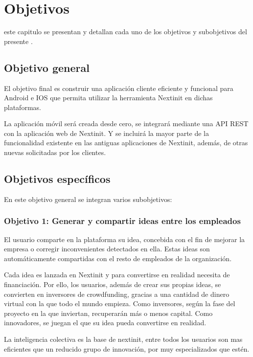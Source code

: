 \chapter{Objetivos}
\label{chap:objetivos}

 este capitulo se presentan y detallan cada uno de los objetivos y subobjetivos
del presente .

\section{Objetivo general}

El objetivo final es construir una aplicación cliente eficiente y funcional para Android e IOS
que permita utilizar la herramienta Nextinit en dichas plataformas.

La aplicación móvil será creada desde cero, se integrará mediante una API REST con la aplicación 
web de Nextinit. Y se incluirá la mayor parte de la funcionalidad existente en las antiguas 
aplicaciones de Nextinit, además, de otras nuevas solicitadas por los clientes.


\section{Objetivos específicos}

En este objetivo general se integran varios subobjetivos:

\subsection{Objetivo 1: Generar y compartir ideas entre los empleados}

El usuario comparte en la plataforma su idea, concebida con el fin de mejorar la empresa o corregir 
inconvenientes detectados en ella. Estas ideas son automáticamente compartidas con el resto de empleados
de la organización.

Cada idea es lanzada en Nextinit y para convertirse en realidad necesita de financiación. Por
ello, los usuarios, además de crear sus propias ideas, se convierten en inversores de crowdfunding,
gracias a una cantidad de dinero virtual con la que todo el mundo empieza. Como inversores,
según la fase del proyecto en la que inviertan, recuperarán más o menos capital. Como
innovadores, se juegan el que su idea pueda convertirse en realidad.

La inteligencia colectiva es la base de nextinit, entre todos los usuarios son mas eficientes que un 
reducido grupo de innovación, por muy especializados que estén.

